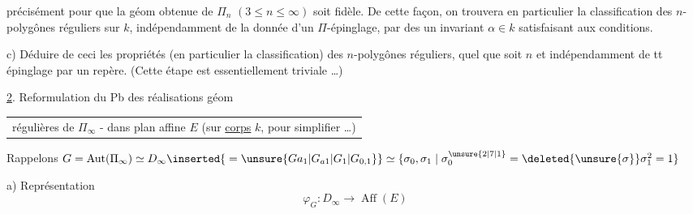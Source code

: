 précisément pour que la   géom
obtenue de $\Pi_n$ $(3\leq n\leq\infty)$ soit
fidèle. De cette façon, on trouvera en
particulier la classification des  $n$-polygônes
réguliers sur $k$, indépendamment de la
donnée d'un $\Pi$-épinglage, par des
 un invariant $\alpha\in k$ satisfaisant aux 
conditions.

c) Déduire de ceci les  propriétés
  (en particulier la classification)
des $n$-polygônes réguliers, quel que soit $n$
et indépendamment de tt épinglage
par un repère. (Cette étape est
essentiellement triviale \ldots)

\uline{2}. Reformulation du Pb des réalisations géom
\begin{tabular}{|p{.91\linewidth}}régulières de $\Pi_\infty$ - dans plan affine $E$
(sur \uline{corps} $k$, pour simplifier \ldots)\end{tabular}

Rappelons $G=\operatorname{Aut}(\Pi_\infty)\simeq D_\infty\inserted{{}=\unsure{Ga_1|G_{a1}|G_1|G_{0,1}}}\simeq\{\sigma_0,\sigma_1\mid\sigma_0^{\unsure{2|7|1}}=\deleted{\unsure{\sigma}}\sigma_1^2=1\}$

a) Représentation
\[ \varphi_G:D_\infty\longrightarrow\operatorname{Aff}(E) \tag*{(1)} \]
